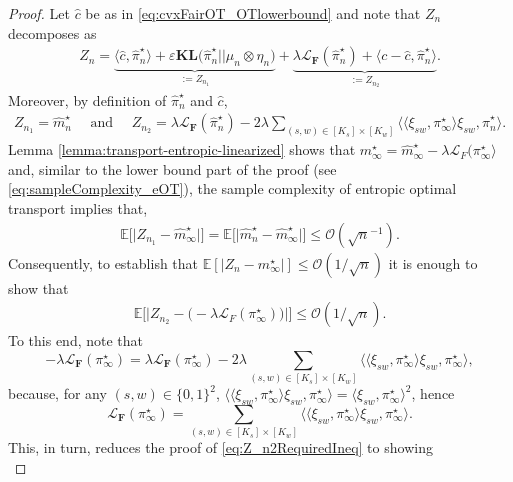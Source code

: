 \documentclass{article}
\newcommand{\kl}{\mathbf{KL}}
\theoremstyle{definition}
\begin{document}
\begin{proof}
Let $\hat c$ be as in \eqref{eq:cvxFairOT_OTlowerbound} and  note that $Z_n$ decomposes as \begin{align*}
    Z_n=\underbrace{\langle \hat c, \hat\pi_n^\star \rangle + \varepsilon\kl\big(\hat\pi_n^\star||\mu_n\otimes\eta_n\big)}_{:=Z_{n_1}}+ \underbrace{\lambda\mathcal{L}_\mathbf{F}(\hat\pi_n^\star)+\langle c-\hat{c},\hat{\pi}_n^\star\rangle}_{:=Z_{n_2}}.
\end{align*}
Moreover, by definition of $\hat{\pi}_n^\star$ and  $\hat{c}$, 
\begin{align*}
Z_{n_1}=\widehat{m}_n^\star \quad \text{ and } \quad  Z_{n_2}=\lambda\mathcal{L}_\mathbf{F}(\hat\pi_n^\star)-2\lambda\sum_{(s,w)\in [K_s] \times [K_w]}\big\langle \langle \xi_{sw},\pi^\star_\infty\rangle \xi_{sw},\hat \pi_n^\star
\big\rangle .
\end{align*} 
Lemma \ref{lemma:transport-entropic-linearized} shows that $m^\star_\infty=\widehat{m}_\infty^\star-\lambda \mathcal{L}_F(\pi^\star_\infty\rangle$ and, similar to the lower bound part of the proof (see \eqref{eq:sampleComplexity_eOT}), the sample complexity of entropic optimal transport implies that,
\begin{align*}
 \mathbb{E}\big[\big| Z_{n_1}-\widehat{m}_\infty^\star\big|\big]=\mathbb{E}\big[\big| \widehat{m}_n^\star-\widehat{m}_\infty^\star\big|\big]\leq \mathcal{O}(\sqrt{n}^{-1}).
\end{align*}
Consequently, to establish that $\mathbb{E}[|Z_n-m^\star_\infty|]\leq \mathcal{O}(1/\sqrt{n})$ it is enough to show that 
\begin{align}\label{eq:Z_n2RequiredIneq}
\mathbb{E}\big[\big|Z_{n_2}-\big(-\lambda \mathcal{L}_F(\pi_\infty^\star)\big)\big|\big]\leq\mathcal{O}(1/\sqrt{n}).
\end{align}
To this end, note that $$-\lambda \mathcal{L}_\mathbf{F}(\pi_\infty^\star)=\lambda\mathcal{L}_\mathbf{F}(\pi_\infty^\star)-2\lambda\sum_{(s,w)\in [K_s] \times [K_w]}\big\langle \langle \xi_{sw},\pi^\star_\infty\rangle \xi_{sw}, \pi_\infty^\star
\big\rangle,$$
because, for any $(s,w) \in \{0,1\}^2$, $\big\langle \langle \xi_{sw},\pi^\star_\infty\rangle \xi_{sw}, \pi_\infty^\star
\big\rangle = \big\langle \xi_{sw}, \pi_\infty^\star
\big\rangle^2$, hence 
\[
    \mathcal{L}_\mathbf{F}(\pi_\infty^\star)=\sum_{(s,w)\in [K_s] \times [K_w]}\big\langle \langle \xi_{sw},\pi^\star_\infty\rangle \xi_{sw}, \pi_\infty^\star
    \big\rangle.
\]
This, in turn, reduces the proof of \eqref{eq:Z_n2RequiredIneq} to showing
\begin{equation}\label{eq:Z_n2Decomp2}

\end{equation}
\end{proof}
\end{document}
